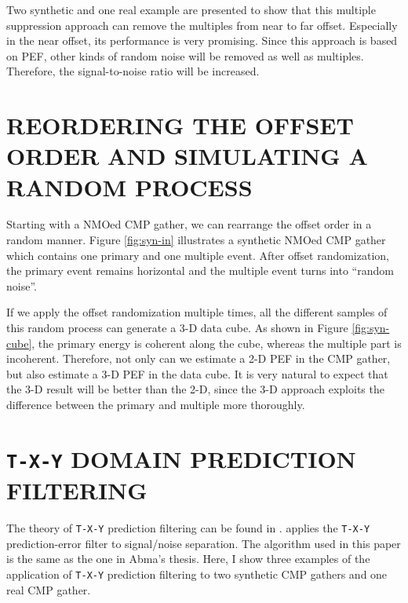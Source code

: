 Two synthetic and one real example are presented to show that this multiple 
suppression approach can remove the multiples from near to far offset.  
Especially in the near offset, its performance is very promising. Since this 
approach is based on PEF, other kinds of random noise will be removed as well 
as multiples. Therefore, the signal-to-noise ratio will be increased. 

\section{REORDERING THE OFFSET ORDER AND SIMULATING A RANDOM PROCESS}

Starting with a NMOed CMP gather, we can rearrange the offset order in a 
random manner.
Figure \ref{fig:syn-in} illustrates a synthetic NMOed CMP gather which 
contains one primary and one multiple event. After offset randomization, 
the primary event remains horizontal and the multiple event turns into 
``random noise''.


If we apply the offset randomization multiple times, all the different samples 
of this random 
process can generate a 3-D data cube. As shown in Figure \ref{fig:syn-cube}, 
the primary energy is coherent along the cube, whereas the multiple part is 
incoherent. Therefore, not only can we estimate a 2-D PEF in the CMP gather, 
but also estimate a 3-D PEF in the data cube. It is very natural to expect 
that the 3-D result will be better than the 2-D, since the 3-D approach 
exploits the difference between the primary and multiple more thoroughly. 



\section{{\tt T-X-Y} DOMAIN PREDICTION FILTERING}

The theory of {\tt T-X-Y} prediction filtering can be found in 
\cite{Claerbout.tdf.82}. \cite{Abma.sepphd.88} 
applies the {\tt T-X-Y} prediction-error filter to signal/noise separation.  
The algorithm used in this paper is the same as the one in Abma's thesis. 
Here, I show three examples of the application of {\tt T-X-Y} 
prediction filtering to two synthetic CMP gathers and one real CMP gather.

